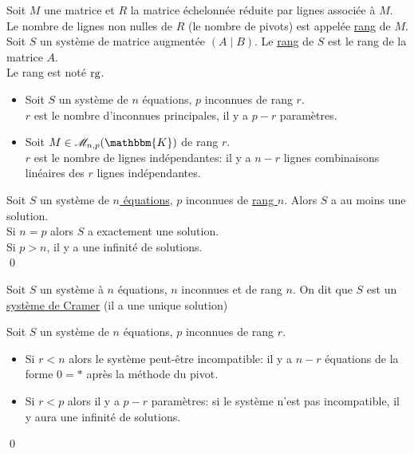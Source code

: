\begin{defn}
	Soit $M$ une matrice et $R$ la matrice échelonnée réduite par lignes associée à $M$. Le nombre de lignes non nulles de $R$ (le nombre de pivots) est appelée \underline{rang} de $M$.\\
	Soit $S$ un système de matrice augmentée $(A \mid B)$. Le \underline{rang} de $S$ est le rang de la matrice $A$.\\
	Le rang est noté $\operatorname{rg}$.
\end{defn}

\begin{prop}
	[Interprétation]
	\begin{itemize}
		\item Soit $S$ un système de $n$ équations, $p$ inconnues de rang $r $.\\
			$r$ est le nombre d'inconnues principales, il y a $p - r$ paramètres.
		\item Soit $M \in \mathcal{M}_{n,p}(\mathbbm{K})$ de rang $r$.\\
			$r$ est le nombre de lignes indépendantes: il y a $n - r$ lignes combinaisons linéaires des $r$ lignes indépendantes.
	\end{itemize}
\end{prop}

\begin{crlr}
	Soit $S$ un système de \underline{$n$ équations}, $p$ inconnues de \underline{rang $n$}. Alors $S$ a au moins une solution.\\
	Si $n = p$ alors $S$ a exactement une solution.\\
	Si $p > n$, il y a une infinité de solutions.\\
	\qed
\end{crlr}

\begin{defn}
	Soit $S$ un système à $n$ équations, $n$ inconnues et de rang $n$. On dit que $S$ est un \underline{système de Cramer} (il a une unique solution)
\end{defn}

\begin{prop}
	Soit $S$ un système de $n$ équations, $p$ inconnues de rang $r$.
	\begin{itemize}
		\item Si $r < n$ alors le système peut-être incompatible: il y a $n - r$ équations de la forme $0 = *$ après la méthode du pivot.
		\item Si $r < p$ alors il y a $p - r$ paramètres: si le système n'est pas incompatible, il y aura une infinité de solutions.
	\end{itemize}
	\qed
\end{prop}

